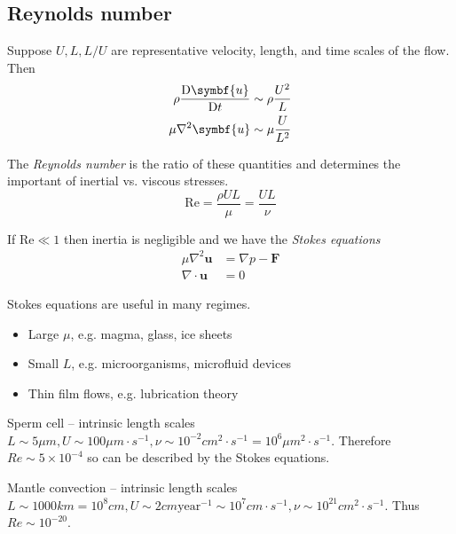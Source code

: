 \documentclass{jknotes}
\begin{document}
\subsection{Reynolds number}
Suppose $U, L, L/U$ are representative velocity, length, and time scales of
the flow. Then
\begin{equation}
	\begin{aligned}
		\rho \frac{\diffD{\symbf{u}}}{\diffD{t}} &\sim \rho \frac{U^2}{L} \\
		\mu \nabla^2 \symbf{u} &\sim \mu \frac{U}{L^2}
	\end{aligned}
\end{equation}

\begin{defn}
The \emph{Reynolds number} is the ratio of these quantities and determines the
important of inertial vs. viscous stresses. 
\begin{equation}
	\text{Re} = \frac{\rho U L}{\mu} = \frac{U L}{\nu}
\end{equation}
\end{defn}

If $\text{Re} \ll 1$ then inertia is negligible and we have the \emph{Stokes
equations}
\begin{equation}
	\begin{aligned}
		\mu \nabla^2 \symbf{u} &= \nabla p - \symbf{F} \\
		\nabla \cdot \symbf{u} &= 0
	\end{aligned}
\end{equation}

Stokes equations are useful in many regimes.
\begin{itemize}
	\item Large $\mu$, e.g. magma, glass, ice sheets
	\item Small $L$, e.g. microorganisms, microfluid devices
	\item Thin film flows, e.g. lubrication theory
\end{itemize}
\begin{eg}
	Sperm cell -- intrinsic length scales $L \sim 5 \mu m, U \sim 100 \mu m
	\cdot s^{-1}, \nu \sim 10^{-2} cm^2 \cdot s^{-1} = 10^6 \mu m^2 \cdot
	s^{-1}$. Therefore $Re \sim 5 \times 10^{-4}$ so can be described by the
	Stokes equations.
\end{eg}

\begin{eg}
	Mantle convection -- intrinsic length scales $L \sim 1000 km = 10^8 cm, U
	\sim 2 cm \text{year}^{-1} \sim 10^7 cm \cdot s^{-1}, \nu \sim 10^{21}
	cm^2 \cdot s^{-1}$. Thus $Re \sim 10^{-20}$.
\end{eg}
\end{document}
